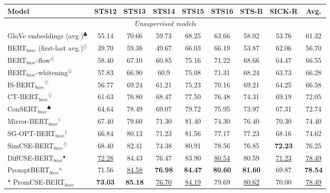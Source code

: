 \documentclass[11pt]{article}
\begin{document}
\begin{table*}[!t]
\small
\centering
\begin{tabular}{lcccccccc}
\toprule
\textbf{Model}                      & \textbf{STS12} & \textbf{STS13} & \textbf{STS14} & \textbf{STS15} & \textbf{STS16} & \textbf{STS-B} & \textbf{SICK-R} & \textbf{Avg.}  \\
\midrule
\midrule
\multicolumn{9}{c}{\textit{Unsupervised models}} \\\midrule
GloVe embeddings (avg.)$^\clubsuit$    & 55.14 & 70.66 & 59.73 & 68.25 & 63.66 & 58.02 & 53.76  & 61.32 \\
BERT$_{base}$ (first-last avg.)$^\diamondsuit$ & 39.70  & 59.38 & 49.67 & 66.03 & 66.19 & 53.87 & 62.06  & 56.70  \\
BERT$_{base}$-flow$^\diamondsuit$              & 58.40  & 67.10  & 60.85 & 75.16 & 71.22 & 68.66 & 64.47  & 66.55 \\
BERT$_{base}$-whitening$^\diamondsuit$         & 57.83 & 66.90  & 60.9  & 75.08 & 71.31 & 68.24 & 63.73  & 66.28 \\
IS-BERT$_{base}$$^\heartsuit$                & 56.77 & 69.24 & 61.21 & 75.23 & 70.16 & 69.21 & 64.25  & 66.58 \\
CT-BERT$_{base}$$^\diamondsuit$                & 61.63 & 76.80  & 68.47 & 77.50  & 76.48 & 74.31 & 69.19  & 72.05 \\
ConSERT$_{base}$$^\spadesuit$                & 64.64 & 78.49 & 69.07 & 79.72 & 75.95 & 73.97 & 67.31  & 72.74 \\
Mirror-BERT$_{base}$$^\dag$            & 67.40  & 79.60  & 71.30  & 81.40  & 74.30  & 76.40  & 70.30   & 74.40  \\
SG-OPT-BERT$_{base}$$^\ddag$            & 66.84 & 80.13 & 71.23 & 81.56 & 77.17 & 77.23 & 68.16  & 74.62 \\
SimCSE-BERT$_{base}$$^\diamondsuit$            & 68.40  & 82.41 & 74.38 & 80.91 & 78.56 & 76.85 & \textbf{72.23}  & 76.25 \\
DiffCSE-BERT$_{base}$$^\blacklozenge$           & \underline{72.28} & 84.43 & 76.47 & 83.90  & \underline{80.54} & 80.59 & \underline{71.23}  & \underline{78.49} \\
PromptBERT$_{base}$$^\vartriangle$             & 71.56 & \underline{84.58} & \textbf{76.98} & \textbf{84.47} & \textbf{80.60}  & \textbf{81.60}  & 69.87  & \textbf{78.54} \\
$*$ PromCSE-BERT$_{base}$         & \textbf{73.03} & \textbf{85.18} & \underline{76.70}  & \underline{84.19} & 79.69 & \underline{80.62} & 70.00     & \underline{78.49} \\

\end{tabular}
\end{table*}
\end{document}
